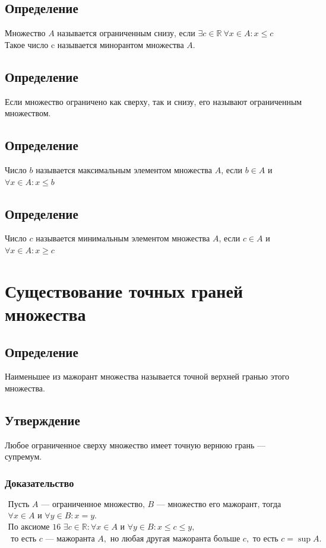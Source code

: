 \documentclass{article}
\begin{document}
\subsection{Определение}
Множество $A$ называется ограниченным снизу, если $\exists c \in \mathbb{R} ~ \forall x \in A: x \le c$ \\
Такое число c называется минорантом множества $A$.


\subsection{Определение}
Если множество ограничено как сверху, так и снизу, его называют ограниченным множеством.


\subsection{Определение}
Число $b$ называется максимальным элементом множества $A$, если $b \in A$ и $\forall x \in A: x \le b$ 


\subsection{Определение}
Число $c$ называется минимальным элементом множества $A$, если $c \in A$ и $\forall x \in A: x \ge c$ 



\section{Существование точных граней множества}

\subsection{Определение}
Наименьшее из мажорант множества называется точной верхней гранью этого множества.


\subsection{Утверждение}
Любое ограниченное сверху множество имеет точную вернюю грань --- супремум.

\subsubsection{Доказательство}
\begin{gather*}
    \text{Пусть } A \text { --- ограниченное множество, } B \text { --- множество его мажорант, тогда} \\ 
    \forall x \in A \text{ и } \forall y \in B: x = y. \\
    \text{По аксиоме 16 } \exists c \in \mathbb{R}: \forall x \in A \text{ и } \forall y \in B: x \le c \le y, \\
    \text{ то есть } c \text{ --- мажоранта } A, \text{ но любая другая мажоранта больше } c, \text{ то есть } c = \sup A.
\end{gather*}
\end{document}
